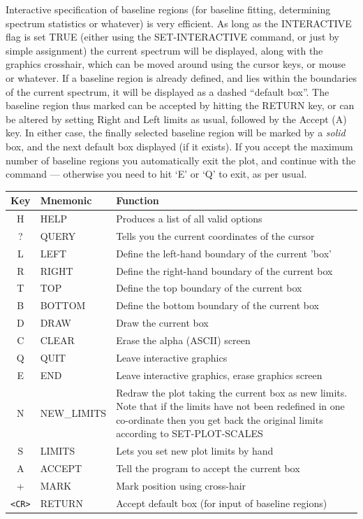 \documentclass[11pt,twoside]{report}
\begin{document}
Interactive specification of baseline regions
(for baseline fitting, determining spectrum statistics or
whatever) is very efficient. As long as the INTERACTIVE
flag is set TRUE (either using the SET-INTERACTIVE command, or just by simple
assignment) the current spectrum will be displayed, along with the graphics
crosshair, which can be moved around using the cursor keys, or mouse or
whatever. If a baseline region is already defined, and lies within the
boundaries of the current spectrum, it will be displayed as a dashed ``default
box''. The baseline region thus marked can be accepted by hitting the RETURN
key, or can be altered by setting Right and Left limits as usual, followed by
the Accept (A) key. In either case, the finally selected baseline region will
be marked by a {\em solid} box, and the next default box 
 displayed (if it exists). If you accept the maximum number
of baseline regions you automatically exit the plot, and continue with the
command --- otherwise you need to hit `E' or `Q' to exit, as per usual. 

\begin{table}[htbp]
\begin{center}
\begin{tabular}{|c|l|l|} \hline
Key	& Mnemonic	& Function \\ \hline
H	&HELP	&Produces a list of all valid options\\
?	&QUERY	&Tells you the current coordinates of the cursor\\
L	&LEFT	&Define the left-hand boundary of the current 'box'\\
R	&RIGHT	&Define the right-hand boundary of the current box\\
T	&TOP	&Define the top boundary of the current box\\
B	&BOTTOM	&Define the bottom boundary of the current box\\
D	&DRAW	&Draw the current box\\
C	&CLEAR	&Erase the alpha (ASCII) screen\\
Q	&QUIT	&Leave interactive graphics\\
E	&END	&Leave interactive graphics, erase graphics screen\\
N	&NEW\_LIMITS    &
    \parbox[t]{3.7in}{Redraw the plot taking the current box as new
            limits. Note that if the limits have not been
            redefined in one co-ordinate then you get back the
            original limits according to SET-PLOT-SCALES}\\
S	&LIMITS	&Lets you set new plot limits by hand\\
A	&ACCEPT	&Tell the program to accept the current box\\
+	&MARK	&Mark position using cross-hair\\
\verb+<CR>+ &RETURN &Accept default box (for input of baseline regions)\\ \hline
\end{tabular}
\end{center}
\end{table}
\end{document}

